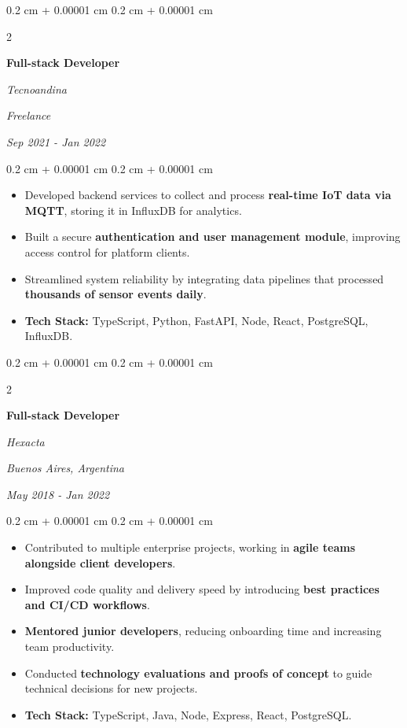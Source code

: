 \documentclass[10pt, letterpaper]{article}
\newenvironment{highlights}{
    \begin{itemize}[
        topsep=0.10 cm,
        parsep=0.10 cm,
        partopsep=0pt,
        itemsep=0pt,
        leftmargin=0.4 cm + 10pt
    ]
}{
    \end{itemize}
} %
\newenvironment{onecolentry}{
    \begin{adjustwidth}{
        0.2 cm + 0.00001 cm
    }{
        0.2 cm + 0.00001 cm
    }
}{
    \end{adjustwidth}
} %
\newenvironment{twocolentry}[2][]{
    \onecolentry
    \def\secondColumn{#2}
    \setcolumnwidth{\fill, 4.5 cm}
    \begin{paracol}{2}
}{
    \switchcolumn \raggedleft \secondColumn
    \end{paracol}
    \endonecolentry
} %
\begin{document}
        \begin{twocolentry}{
        \textit{Freelance}

        \textit{Sep 2021 - Jan 2022}}
            \textbf{Full-stack Developer}

            \textit{Tecnoandina}
        \end{twocolentry}

        \vspace{0.10 cm}
        \begin{onecolentry}
            \begin{highlights}
                \item Developed backend services to collect and process \textbf{real-time IoT data via MQTT}, storing it in InfluxDB for analytics.
                \item Built a secure \textbf{authentication and user management module}, improving access control for platform clients.
                \item Streamlined system reliability by integrating data pipelines that processed \textbf{thousands of sensor events daily}.
                \item \textbf{Tech Stack:} TypeScript, Python, FastAPI, Node, React, PostgreSQL, InfluxDB.
            \end{highlights}
        \end{onecolentry}


        \vspace{0.2 cm}

        \begin{twocolentry}{
        \textit{Buenos Aires, Argentina}

        \textit{May 2018 - Jan 2022}}
            \textbf{Full-stack Developer}

            \textit{Hexacta}
        \end{twocolentry}

        \vspace{0.10 cm}
        \begin{onecolentry}
            \begin{highlights}
                \item Contributed to multiple enterprise projects, working in \textbf{agile teams alongside client developers}.
                \item Improved code quality and delivery speed by introducing \textbf{best practices and CI/CD workflows}.
                \item \textbf{Mentored junior developers}, reducing onboarding time and increasing team productivity.
                \item Conducted \textbf{technology evaluations and proofs of concept} to guide technical decisions for new projects.
                \item \textbf{Tech Stack:} TypeScript, Java, Node, Express, React, PostgreSQL.
            \end{highlights}
        \end{onecolentry}
\end{document}
